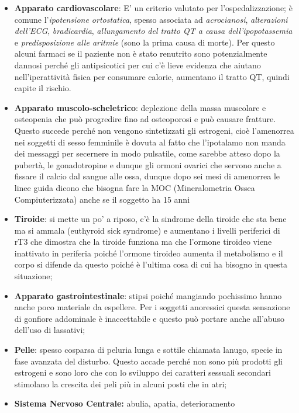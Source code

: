 \documentclass[]{article}
\begin{document}
\begin{itemize}
\item
  \textbf{Apparato cardiovascolare}: E' un criterio valutato per
  l'ospedalizzazione; è comune l'\emph{ipotensione ortostatica}, spesso
  associata ad \emph{acrocianosi}, \emph{alterazioni dell'ECG},
  \emph{bradicardia}, \emph{allungamento del tratto QT a causa
  dell'ipopotassemia} e \emph{predisposizione alle aritmie} (sono la
  prima causa di morte). Per questo alcuni farmaci se il paziente non è
  stato renutrito sono potenzialmente dannosi perché gli antipsicotici
  per cui c'è lieve evidenza che aiutano nell'iperattività fisica per
  consumare calorie, aumentano il tratto QT, quindi capite il rischio.
\item
  \textbf{Apparato muscolo-scheletrico}: deplezione della massa
  muscolare e osteopenia che può progredire fino ad osteoporosi e può
  causare fratture. Questo succede perché non vengono sintetizzati gli
  estrogeni, cioè l'amenorrea nei soggetti di sesso femminile è dovuta
  al fatto che l'ipotalamo non manda dei messaggi per secernere in modo
  pulsatile, come sarebbe atteso dopo la pubertà, le gonadotropine e
  dunque gli ormoni ovarici che servono anche a fissare il calcio dal
  sangue alle ossa, dunque dopo sei mesi di amenorrea le linee guida
  dicono che bisogna fare la MOC (Mineralometria Ossea Compiuterizzata)
  anche se il soggetto ha 15 anni
\item
  \textbf{Tiroide}: si mette un po' a riposo, c'è la sindrome della
  tiroide che sta bene ma si ammala (euthyroid sick syndrome) e
  aumentano i livelli periferici di rT3 che dimostra che la tiroide
  funziona ma che l'ormone tiroideo viene inattivato in periferia poiché
  l'ormone tiroideo aumenta il metabolismo e il corpo si difende da
  questo poiché è l'ultima cosa di cui ha bisogno in questa situazione;
\item
  \textbf{Apparato gastrointestinale}: stipsi poiché mangiando
  pochissimo hanno anche poco materiale da espellere. Per i soggetti
  anoressici questa sensazione di gonfiore addominale è inaccettabile e
  questo può portare anche all'abuso dell'uso di lassativi;
\item
  \textbf{Pelle}: spesso cosparsa di peluria lunga e sottile chiamata
  lanugo, specie in fase avanzata del disturbo. Questo accade perché non
  sono più prodotti gli estrogeni e sono loro che con lo sviluppo dei
  caratteri sessuali secondari stimolano la crescita dei peli più in
  alcuni posti che in atri;
\item
  \textbf{Sistema Nervoso Centrale:} abulia, apatia, deterioramento

\end{itemize}
\end{document}
